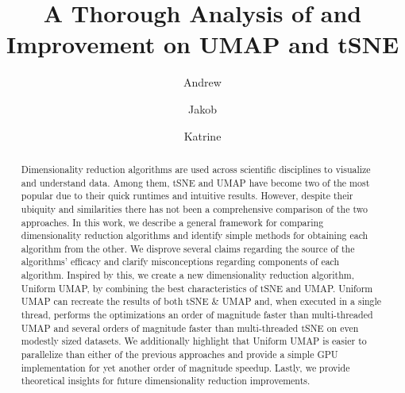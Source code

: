 \documentclass[sigconf, nonacm]{acmart}
\begin{document}
\title{A Thorough Analysis of and Improvement on UMAP and tSNE}

\author{Andrew}
\author{Jakob}
\author{Katrine}
\begin{abstract}
Dimensionality reduction algorithms are used across scientific disciplines to visualize and understand data. Among them, tSNE and UMAP have become two of the most
popular due to their quick runtimes and intuitive results. However, despite their ubiquity and similarities there
has not been a comprehensive comparison of the two approaches. In this work, we describe a general framework for comparing dimensionality reduction algorithms and
identify simple methods for obtaining each algorithm from the other. We disprove several claims regarding the source of the algorithms' efficacy and clarify
misconceptions regarding components of each algorithm. Inspired by this, we create a new dimensionality reduction algorithm, Uniform UMAP, by combining the best characteristics of tSNE
and UMAP. Uniform UMAP can recreate the results of both tSNE \& UMAP and, when executed in a single thread, performs the optimizations an order of magnitude faster than
multi-threaded UMAP and several orders of magnitude faster than multi-threaded tSNE on even modestly sized datasets. We additionally highlight that Uniform UMAP is easier to parallelize than either of the previous approaches and provide
a simple GPU implementation for yet another order of magnitude speedup.
Lastly, we provide theoretical insights for future dimensionality reduction improvements.
\end{abstract}

\maketitle
\end{document}
